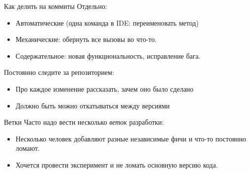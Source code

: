 \begin{frame}[t]{Как делить на коммиты}
Отдельно:
\begin{itemize}
\item Автоматические (одна команда в IDE: переименовать метод)
\item Механические: обернуть все вызовы во что-то.
\item Содержательное: новая функциональность, исправление бага.
\end{itemize}
Постоянно следите за репозиторием:
\begin{itemize}
\item Про каждое изменение рассказать, зачем оно было сделано
\item Должно быть можно откатываться между версиями
\end{itemize}

\end{frame}

\begin{frame}[t]{Ветки}
Часто надо вести несколько \textit{веток} разработки:
\begin{itemize}
\item
	Несколько человек добавляют разные независимые фичи и что-то постоянно ломают.
\item 
	Хочется провести эксперимент и не ломать основную версию кода.
\end{itemize}
\end{frame}
